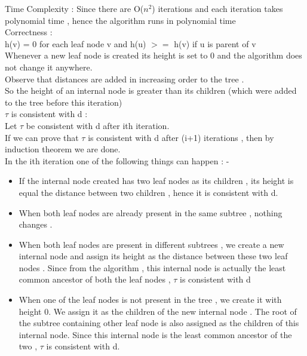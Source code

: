 \documentclass[11pt]{article}
\begin{document}
Time Complexity : Since there are O($n^2$) iterations and each iteration takes polynomial time , hence the algorithm runs in polynomial time \\

Correctness : \\

h(v) = 0 for each leaf node v and h(u) $>=$ h(v) if u is parent of v \\

Whenever a new leaf node is created its height is set to 0 and the algorithm does not change it anywhere. \\
Observe that distances are added in increasing order to the tree . \\
So the height of an internal node is greater than its children (which were added to the tree before this iteration) \\


$\tau$ is consistent with d  :\\

Let $\tau$ be consistent with d after ith iteration. \\
If we can prove that $\tau$ is consistent with d after (i+1) iterations , then by induction theorem we are done. \\

In the ith iteration one of the following things can happen : - \\
\begin{itemize}
\item If the internal node created has two leaf nodes as its children  , its height is equal the distance between two children , hence it is consistent with d. \\
\item When both leaf nodes are already present in the same subtree , nothing changes . \\
\item When both leaf nodes are present in different subtrees , we create a new internal node and assign its height as the distance between these two leaf nodes . Since from the algorithm , this internal node is actually the least common ancestor of both the leaf nodes , $\tau$ is consistent with d \\
\item When one of the leaf nodes is not present in the tree , we create it with height 0. We assign it as the children of the new internal node . The root of the subtree containing other leaf node is also assigned as the children of this internal node. Since this internal node is the least common ancestor of the two , $\tau$ is consistent with d. \\

\end{itemize}
\end{document}
